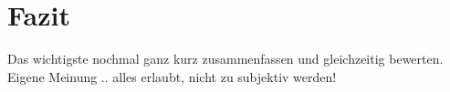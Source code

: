 \chapter{Fazit}

Das wichtigste nochmal ganz kurz zusammenfassen und gleichzeitig bewerten.
Eigene Meinung .. alles erlaubt, nicht zu subjektiv werden!
